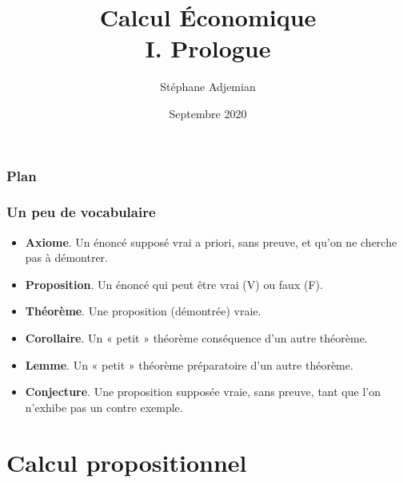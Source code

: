 \documentclass[10pt,notheorems]{beamer}
\theoremstyle{plain}
\theoremstyle{definition} %
\begin{document}
\title{Calcul Économique\\\small{I. Prologue}}
\author[S. Adjemian]{Stéphane Adjemian}
 \date{Septembre 2020}

\begin{frame}
  \titlepage{}
\end{frame}

\begin{frame}
  \frametitle{Plan}
  \tableofcontents
\end{frame}


\begin{frame}
  \frametitle{Un peu de vocabulaire}
  \hypertarget{slide_vocabulaire}{}

  \begin{itemize}

  \item \textbf{Axiome}. Un énoncé supposé vrai a priori, sans preuve,
    et qu'on ne cherche pas à démontrer.\newline

  \item \textbf{Proposition}. Un énoncé qui peut être vrai (V) ou faux
    (F).\newline

  \item \textbf{Théorème}. Une proposition (démontrée) vraie.\newline

  \item \textbf{Corollaire}. Un « petit » théorème conséquence
    d'un autre théorème.\newline

  \item \textbf{Lemme}. Un « petit » théorème préparatoire d'un
    autre théorème.\newline

  \item \textbf{Conjecture}. Une proposition supposée vraie, sans
    preuve, tant que l'on n'exhibe pas un contre exemple.\newline

  \end{itemize}

\end{frame}

\section{Calcul propositionnel}
\end{document}
